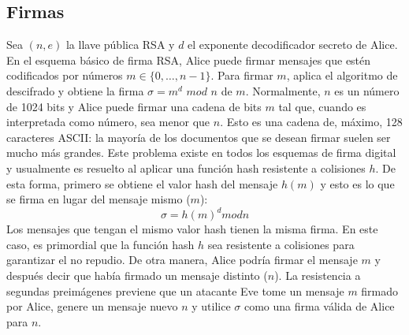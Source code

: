 \subsection{Firmas}
Sea $(n, e)$ la llave pública RSA y $d$ el exponente decodificador secreto
de Alice. En el esquema básico de firma RSA, Alice puede firmar mensajes
que estén codificados por números $ m \in \{0, \dots, n-1\}$. Para firmar
$m$, aplica el algoritmo de descifrado y obtiene la firma $\sigma = m^d$ $mod$ $n$ de $m$.
Normalmente, $n$ es un número de 1024 bits y Alice puede firmar una cadena
de bits $m$ tal que, cuando es interpretada como número, sea menor que 
$n$. Esto es una cadena de, máximo, 128 caracteres ASCII: la mayoría de 
los documentos que se desean firmar suelen ser mucho más grandes. Este 
problema existe en todos los esquemas de firma digital y usualmente es 
resuelto al aplicar una función hash resistente a colisiones $h$. 
De esta forma, primero se obtiene el valor hash del mensaje $h(m)$ y esto
es lo que se firma en lugar del mensaje mismo ($m$):
\begin{equation}
  \label{funcion_hash_sign}
 	\sigma = h(m)^d mod n
\end{equation}
Los mensajes que tengan el mismo valor hash tienen la misma firma. En este
caso, es primordial que la función hash $h$ sea resistente a colisiones 
para garantizar el no repudio. De otra manera, Alice podría firmar el 
mensaje $m$ y después decir que había firmado un mensaje distinto ($n$).
La resistencia a segundas preimágenes previene que un atacante Eve tome un
mensaje $m$ firmado por Alice, genere un mensaje nuevo $n$ y utilice 
$\sigma$ como una firma válida de Alice para $n$.